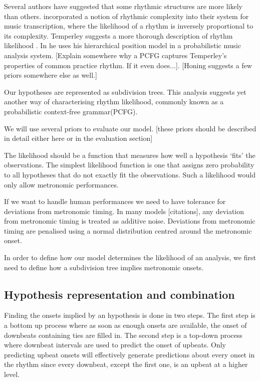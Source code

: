 Several authors have suggested that some rhythmic structures are more likely than others. \cite{cemgil2000rhythm} incorporated a notion of rhythmic complexity into their system for music transcription, where the likelihood of a rhythm is inversely proportional to its complexity. Temperley suggests a more thorough description of rhythm likelihood \citep{temperley2010modeling}. In \cite{temperley2009unified} he uses his hierarchical position model in a probabilistic music analysis system. [Explain somewhere why a PCFG captures Temperley's properties of common practice rhythm. If it even does...]. [Honing suggests a few priors somewhere else as well.]

Our hypotheses are represented as subdivision trees. This analysis suggests yet another way of characterising rhythm likelihood, commonly known as a probabilistic context-free grammar(PCFG). 

We will use several priors to evaluate our model. [these priors should be described in detail either here or in the evaluation section]

The likelihood should be a function that measures how well a hypothesis `fits' the observations. The simplest likelihood function is one that assigns zero probability to all hypotheses that do not exactly fit the observations. Such a likelihood would only allow metronomic performances. 

If we want to handle human performances we need to have tolerance for deviations from metronomic timing. In many models [citations], any deviation from metronomic timing is treated as additive noise. Deviations from metronomic timing are penalised using a normal distribution centred around the metronomic onset.

In order to define how our model determines the likelihood of an analysis, we first need to define how a subdivision tree implies metronomic onsets. 


\subsection{Hypothesis representation and combination}
\label{sec:combination}

Finding the onsets implied by an hypothesis is done in two steps. The first step is a bottom up process where as soon as enough onsets are available, the onset of downbeats containing ties are filled in. The second step is a top-down process where downbeat intervals are used to predict the onset of upbeats. Only predicting upbeat onsets will effectively generate predictions about every onset in the rhythm since every downbeat, except the first one, is an upbeat at a higher level.

